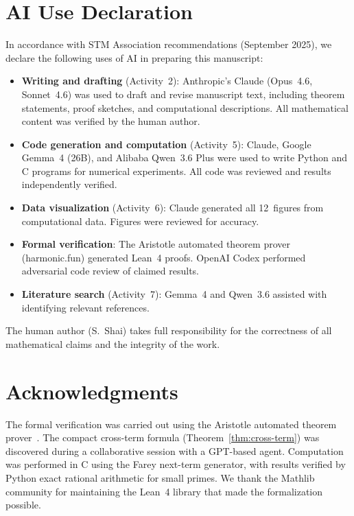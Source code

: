 \documentclass[11pt]{article}
\theoremstyle{definition}
\begin{document}
\section*{AI Use Declaration}

In accordance with STM Association recommendations (September 2025),
we declare the following uses of AI in preparing this manuscript:

\begin{itemize}
\item \textbf{Writing and drafting} (Activity~2): Anthropic's Claude
  (Opus~4.6, Sonnet~4.6) was used to draft and revise manuscript text,
  including theorem statements, proof sketches, and computational descriptions.
  All mathematical content was verified by the human author.

\item \textbf{Code generation and computation} (Activity~5): Claude,
  Google Gemma~4 (26B), and Alibaba Qwen~3.6 Plus were used to write
  Python and C programs for numerical experiments.  All code was reviewed
  and results independently verified.

\item \textbf{Data visualization} (Activity~6): Claude generated all
  12~figures from computational data.  Figures were reviewed for accuracy.

\item \textbf{Formal verification}: The Aristotle automated theorem
  prover (harmonic.fun) generated Lean~4 proofs.  OpenAI Codex performed
  adversarial code review of claimed results.

\item \textbf{Literature search} (Activity~7): Gemma~4 and Qwen~3.6
  assisted with identifying relevant references.
\end{itemize}

\noindent The human author (S.~Shai) takes full responsibility for the
correctness of all mathematical claims and the integrity of the work.

\section*{Acknowledgments}

The formal verification was carried out using the Aristotle
automated theorem prover~\cite{Aristotle2025}.  The compact
cross-term formula (Theorem~\ref{thm:cross-term}) was discovered
during a collaborative session with a GPT-based agent.
Computation was performed in C using the Farey next-term
generator, with results verified by Python exact rational
arithmetic for small primes.  We thank the Mathlib community
for maintaining the Lean~4 library that made the formalization
possible.
\end{document}
